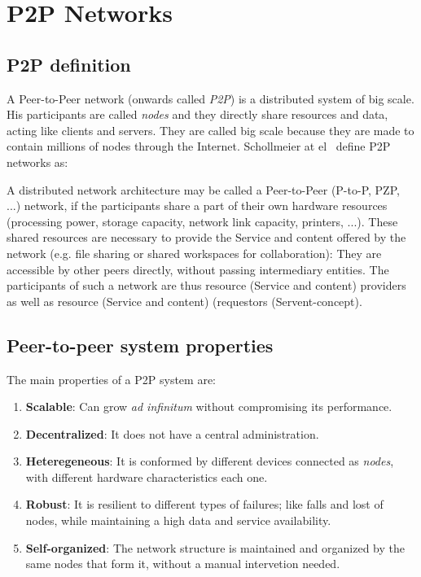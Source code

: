 %

\section{P2P Networks}
\subsection{P2P definition}
\label{sec:p2p_definition}

A Peer-to-Peer network (onwards called \textit{P2P}) is a distributed system of big scale. His participants
are called \textit{nodes} and they directly share resources and data, acting
like clients and servers. They are called big scale because they are made to
contain millions of nodes through the Internet. Schollmeier at
el~\cite{conf_p2p_Schollmeier01} define P2P networks as:

\begin{mydef}
A distributed network architecture may be called a Peer-to-Peer (P-to-P, PZP,
...) network, if the participants share a part of their own hardware resources (processing power, storage capacity, network link capacity, printers, ...). 
These shared resources are necessary to provide the Service and content offered
by the network (e.g.  file sharing or shared workspaces for collaboration):
They are accessible by other peers directly, without passing intermediary
entities. The participants of such a network are thus resource (Service and
content) providers as well as resource (Service and content) (requestors
(Servent-concept).
\end{mydef}

\subsection{Peer-to-peer system properties}
\label{sec:p2p_characteristics}

The main properties of a P2P system are:
\begin{enumerate}
    \item \textbf{Scalable}: Can grow \textit{ad infinitum} without compromising its performance.
    \item \textbf{Decentralized}: It does not have a central administration.
    \item \textbf{Heteregeneous}: It is conformed by different devices
connected as \textit{nodes}, with different hardware characteristics each one.
    \item \textbf{Robust}: It is resilient to different types of failures; like
falls and lost of nodes, while maintaining a high data and service availability.
    \item \textbf{Self-organized}: The network structure is maintained and organized by the same nodes that form it, without a manual intervetion needed.
\end{enumerate}


